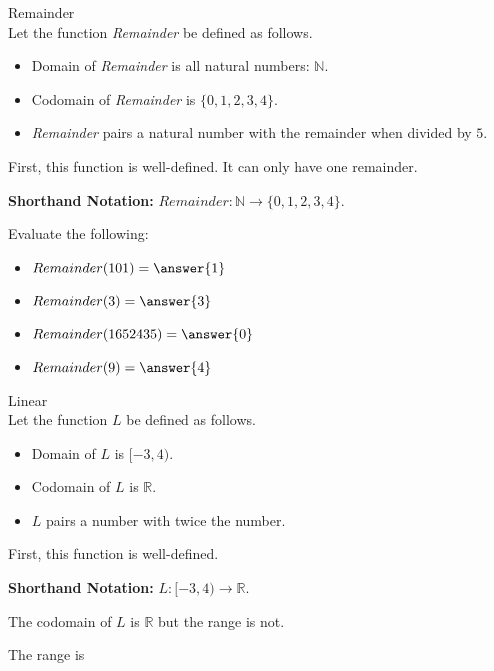 \documentclass{ximera}
\begin{document}
\begin{example} Remainder \\

Let the function \textit{Remainder} be defined as follows.


\begin{itemize}
\item Domain of \textit{Remainder} is all natural numbers: $\mathbb{N}$.
\item Codomain of \textit{Remainder} is $\{ 0, 1, 2, 3, 4 \}$.
\item \textit{Remainder} pairs a natural number with the remainder when divided by $5$.
\end{itemize}


First, this function is well-defined. It can only have one remainder.


\textbf{Shorthand Notation: } $Remainder: \mathbb{N} \rightarrow \{ 0, 1, 2, 3, 4 \}$.

\begin{question}
Evaluate the following:

\begin{itemize}
	\item $Remainder(101) = \answer{1}$
	\item $Remainder(3) = \answer{3}$
	\item $Remainder(1652435) = \answer{0}$
	\item $Remainder(9) = \answer{4}$
\end{itemize}

\end{question}



\end{example}










\begin{example} Linear \\

Let the function $L$ be defined as follows.


\begin{itemize}
\item Domain of $L$ is $[-3, 4)$.
\item Codomain of $L$ is $\mathbb{R}$.
\item $L$ pairs a number with twice the number.
\end{itemize}


First, this function is well-defined. 


\textbf{Shorthand Notation: } $L: [-3, 4) \rightarrow \mathbb{R}$.

\begin{question}

The codomain of $L$ is $\mathbb{R}$ but the range is not.  

The range is \wordChoice{\choice{[}\choice{(}}

\end{question}



\end{example}
\end{document}
